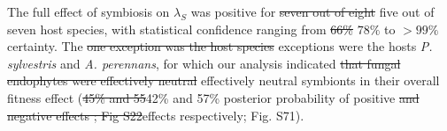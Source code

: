 \documentclass[lineno,sn-nature]{sn-jnl}%
\providecommand{\DIFadd}[1]{{\protect\color{blue}#1}} %
\providecommand{\DIFdel}[1]{{\protect\color{red}\protect\scriptsize\sout{#1}}}
\providecommand{\DIFadd}[1]{{\protect\color{blue}\uwave{#1}}} %
\providecommand{\DIFdel}[1]{{\protect\color{red}\sout{#1}}}                      %
\providecommand{\DIFaddbegin}{} %
\providecommand{\DIFaddend}{} %
\providecommand{\DIFdelbegin}{} %
\providecommand{\DIFdelend}{} %
\newcommand{\DIFscaledelfig}{0.5}
\newlength{\DIFdelgraphicswidth} %
\newlength{\DIFdelgraphicsheight} %
\newcommand{\DIFaddincludegraphics}[2][]{{\color{blue}\fbox{\DIFOincludegraphics[#1]{#2}}}} %
\newcommand{\DIFdelincludegraphics}[2][]{%
\sbox{\DIFdelgraphicsbox}{\DIFOincludegraphics[#1]{#2}}%
\settoboxwidth{\DIFdelgraphicswidth}{\DIFdelgraphicsbox} %
\settoboxtotalheight{\DIFdelgraphicsheight}{\DIFdelgraphicsbox} %
\scalebox{\DIFscaledelfig}{%
\parbox[b]{\DIFdelgraphicswidth}{\usebox{\DIFdelgraphicsbox}\\[-\baselineskip] \rule{\DIFdelgraphicswidth}{0em}}\llap{\resizebox{\DIFdelgraphicswidth}{\DIFdelgraphicsheight}{%
\setlength{\unitlength}{\DIFdelgraphicswidth}%
\begin{picture}(1,1)%
\thicklines\linethickness{2pt} %
{\color[rgb]{1,0,0}\put(0,0){\framebox(1,1){}}}%
{\color[rgb]{1,0,0}\put(0,0){\line( 1,1){1}}}%
{\color[rgb]{1,0,0}\put(0,1){\line(1,-1){1}}}%
\end{picture}%
}\hspace*{3pt}}} %
} %
\DeclareRobustCommand{\DIFaddbegin}{\DIFOaddbegin \let\includegraphics\DIFaddincludegraphics} %
\DeclareRobustCommand{\DIFaddend}{\DIFOaddend \let\includegraphics\DIFOincludegraphics} %
\DeclareRobustCommand{\DIFdelbegin}{\DIFOdelbegin \let\includegraphics\DIFdelincludegraphics} %
\DeclareRobustCommand{\DIFdelend}{\DIFOaddend \let\includegraphics\DIFOincludegraphics} %
\begin{document}
The full effect of symbiosis on $\lambda_{S}$ was positive for \DIFdelbegin \DIFdel{seven out of eight }\DIFdelend \DIFaddbegin \DIFadd{five out of seven }\DIFaddend host species, with statistical confidence ranging from \DIFdelbegin \DIFdel{66\% }\DIFdelend \DIFaddbegin \DIFadd{$78\%$ }\DIFaddend to $>99\%$ certainty.
The \DIFdelbegin \DIFdel{one exception was the host species }\DIFdelend \DIFaddbegin \DIFadd{exceptions were the hosts }\DIFaddend \emph{P. sylvestris} \DIFaddbegin \DIFadd{and }\emph{\DIFadd{A. perennans}}\DIFaddend , for which our analysis indicated \DIFdelbegin \DIFdel{that fungal endophytes were effectively neutral }\DIFdelend \DIFaddbegin \DIFadd{effectively neutral symbionts }\DIFaddend in their overall fitness effect (\DIFdelbegin \DIFdel{45\% and 55}\DIFdelend \DIFaddbegin \DIFadd{42\% and 57}\DIFaddend \% posterior probability of positive \DIFdelbegin \DIFdel{and negative effects ; Fig S22}\DIFdelend \DIFaddbegin \DIFadd{effects respectively; Fig. S71}\DIFaddend ). 
\end{document}
